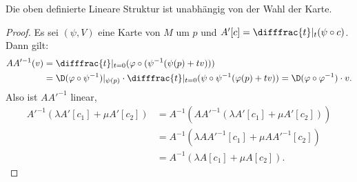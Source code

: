 \begin{lemma}
  Die oben definierte Lineare Struktur ist unabhängig von der Wahl der Karte.
\end{lemma}

\begin{proof}
  Es sei $(\psi, V)$ eine Karte von $M$ um $p$ und $A'[c] = \difffrac{t}|_t(\psi \circ c)$. Dann gilt:
  \begin{align*}
    A A'^{-1}(v) & = \difffrac{t}|_{t=0}(\varphi \circ (\psi^{-1} (\psi(p) + tv)))\\
    & = \D(\varphi \circ \psi^{-1})|_{\psi(p)} \cdot \difffrac{t}|_{t=0}(\psi \circ \psi^{-1}(\varphi(p) + tv)) = \D (\varphi \circ \varphi^{-1}) \cdot v.
  \end{align*}
  Also ist $A A'^{-1}$ linear,
  \begin{align*}
    A'^{-1}(\lambda A'[c_1] + \mu A'[c_2]) & = A^{-1}(A A'^{-1}(\lambda A'[c_1] + \mu A'[c_2]))\\
    & = A^{-1} (\lambda A A'^{-1}[c_1] + \mu A A'^{-1} [c_2])\\
    & = A^{-1}(\lambda A [c_1] + \mu A [c_2]).
  \end{align*}
\end{proof}


